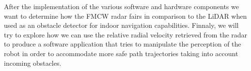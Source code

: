 
After the implementation of the various software and hardware components we want to determine how the \ac{FMCW} \ac{radar} fairs in comparison to the \ac{LiDAR} when used as an obstacle detector for indoor navigation capabilities. Finnaly, we will try to explore how we can use the relative radial velocity retrieved from the \ac{radar} to produce a software application that tries to manipulate the perception of the robot in order to accommodate more safe path trajectories taking into account incoming obstacles. 












